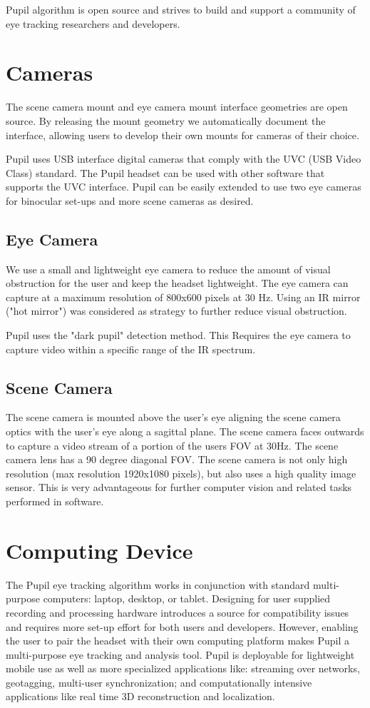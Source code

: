 \documentclass[12pt,fleqn]{book} %
\begin{document}
Pupil algorithm is open source and strives to build and support a community of eye tracking researchers and developers.

\section{Cameras} 
The scene camera mount and eye camera mount interface geometries are open source. By releasing the mount geometry we automatically document the interface, allowing users to develop their own mounts for cameras of their choice. \bigskip

Pupil uses USB interface digital cameras that comply with the UVC (USB Video Class) standard. The Pupil headset can be used with other software that supports the UVC interface. Pupil can be easily extended to use two eye cameras for binocular set-ups and more scene cameras as desired. 

\subsection{Eye Camera} 
We use a small and lightweight eye camera to reduce the amount of visual obstruction for the user and keep the headset lightweight. The eye camera can capture at a maximum resolution of 800x600 pixels at 30 Hz. Using an IR mirror ("hot mirror") was considered as  strategy to further reduce visual obstruction. 

\bigskip
 Pupil uses the "dark pupil" detection method. This Requires the eye camera to capture video within a specific range of the IR spectrum. 
 
 \subsection{Scene Camera} 
  The scene camera is mounted above the user’s eye aligning the scene camera optics with the user’s eye along a sagittal plane. The scene camera faces outwards to capture a video stream of a portion of the users FOV at 30Hz. The scene camera lens has a 90 degree diagonal FOV. The scene camera is not only high resolution (max resolution 1920x1080 pixels), but also uses a high quality image sensor. This is very
advantageous for further computer vision and related tasks
performed in software.


\section{Computing Device} 
The Pupil eye tracking algorithm works in conjunction with standard multi-purpose computers: laptop, desktop, or tablet. Designing for user supplied recording and processing hardware introduces a source for compatibility issues and requires more set-up effort for both users and developers. However, enabling the user to pair the headset with their own computing platform makes Pupil a multi-purpose eye tracking and analysis tool. Pupil is deployable for lightweight mobile use as well as more specialized applications like: streaming over networks, geotagging, multi-user synchronization; and computationally intensive applications like real time 3D reconstruction and localization.
\end{document}
